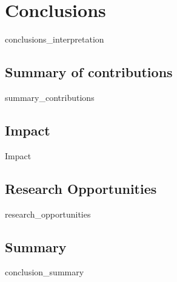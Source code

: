 \chapter{Conclusions}
{conclusions_interpretation}

\section{Summary of contributions}
{summary_contributions}

\section{Impact}
{Impact}

\section{Research Opportunities}
{research_opportunities}

\section{Summary}
{conclusion_summary}